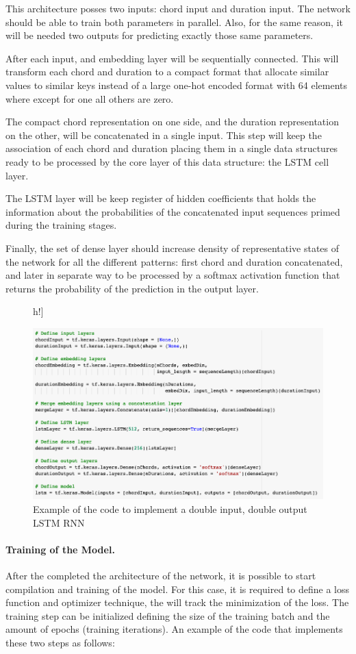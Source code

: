 This architecture posses two inputs: chord input and duration input. The network should be
able to train both parameters in parallel. Also, for the same reason, it will be needed
two outputs for predicting exactly those same parameters.

After each input, and embedding layer will be sequentially connected. This will transform
each chord and duration to a compact format that allocate similar values to similar keys
instead of a large one-hot encoded format with 64 elements where except for one all others
are zero.

The compact chord representation on one side, and the duration representation on the
other, will be concatenated in a single input. This step will keep the association of each
chord and duration placing them in a single data structures ready to be processed by the
core layer of this data structure: the LSTM cell layer.

The LSTM layer will be keep register of hidden coefficients that holds the information
about the probabilities of the concatenated input sequences primed during the training
stages.

Finally, the set of dense layer should increase density of representative states of the
network for all the different patterns: first chord and duration concatenated, and later
in separate way to be processed by a softmax activation function that returns the
probability of the prediction in the output layer.

\begin{figure}[]h!]
  \caption{Example of the code to implement a double input, double output LSTM RNN }
  \includegraphics[width=\linewidth]{image/fig_JDF22.png}
\end{figure}


\paragraph{Training of the Model.} After the completed the architecture of the network, it is possible
to start compilation and training of the model. For this case, it is required to define a
loss function and optimizer technique, the will track the minimization of the loss. The
training step can be initialized defining the size of the training batch and the amount of
epochs (training iterations). An example of the code that implements these two steps as
follows:

